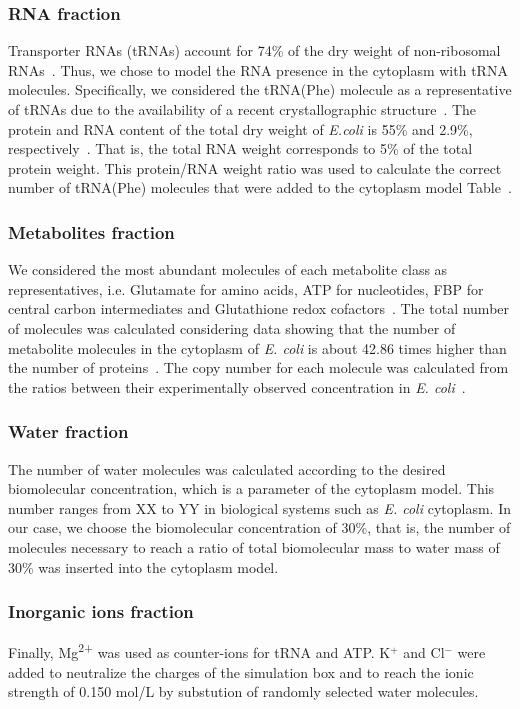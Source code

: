 \documentclass[journal=jacsat,manuscript=article]{achemso}
\newcommand{\tabref}[1]{Table~\plainref{#1}}
\begin{document}
\subsubsection{RNA fraction}
Transporter RNAs (tRNAs) account for 74\% of the dry weight of non-ribosomal RNAs~\cite{phillips2012}. Thus, we chose to model the RNA presence in the cytoplasm with tRNA molecules. Specifically, we considered the tRNA(Phe) molecule as a representative of tRNAs due to the availability of a recent crystallographic structure~\cite{Byrne2015}.
The protein and RNA content of the total dry weight of \textit{E.coli} is 55\% and 2.9\%, respectively~\cite{phillips2012}. That is, the total RNA weight corresponds to 5\% of the total protein weight. This protein/RNA weight ratio was used to calculate the correct number of tRNA(Phe) molecules that were added to the cytoplasm model \tabref{tbl:soup_components}.

\subsubsection{Metabolites fraction}
We considered the most abundant molecules of each metabolite class as representatives, i.e. Glutamate for amino acids, ATP for nucleotides, FBP for central carbon intermediates and Glutathione redox cofactors~\cite{Bennett2009}. The total number of molecules was calculated considering data showing that the number of metabolite molecules in the cytoplasm of \textit{E. coli} is about 42.86 times higher than the number of proteins~\cite{Bennett2009}. The copy number for each molecule was calculated from the ratios between their experimentally observed concentration in {\em E. coli}~\cite{Bennett2009}.

\subsubsection{Water fraction}
The number of water molecules was calculated according to the desired biomolecular concentration, which is a parameter of the cytoplasm model. This number ranges from \colorbox{red!50}{XX to YY} in biological systems such as \textit{E. coli} cytoplasm. In our case, we choose the biomolecular concentration of 30\%, that is, the number of molecules necessary to reach a ratio of total biomolecular mass to water mass of 30\% was inserted into the cytoplasm model.

\subsubsection{Inorganic ions fraction}
Finally, Mg\textsuperscript{2+} was used as counter-ions for tRNA and ATP. K$^{+}$ and Cl$^{-}$ were added to neutralize the charges of the simulation box and to reach the ionic strength of 0.150 mol/L by substution of randomly selected water molecules.
\end{document}
